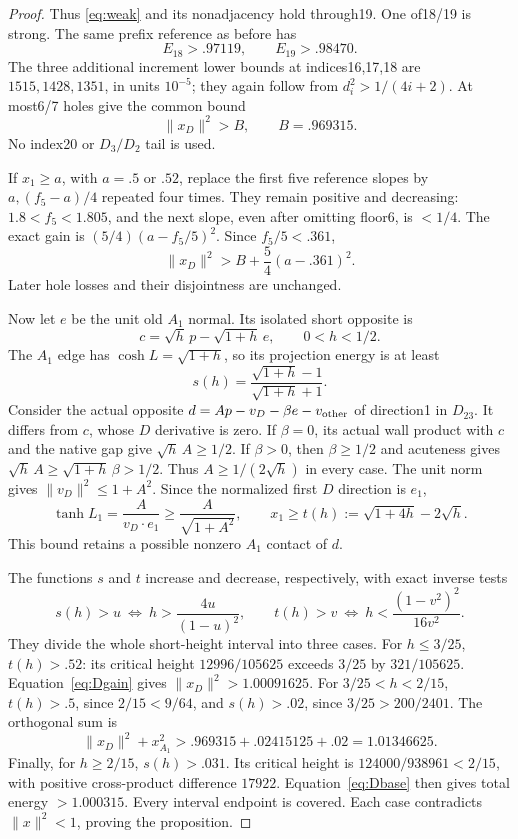 \documentclass[11pt]{article}
\theoremstyle{remark}
\begin{document}
\begin{proof}
Thus \eqref{eq:weak} and its nonadjacency hold through19.
One of18/19 is strong. The same prefix reference as before has
\[
 E_{18}>.97119,\qquad E_{19}>.98470.
\]
The three additional increment lower bounds at indices16,17,18
are \(1515,1428,1351\), in units \(10^{-5}\); they again follow
from \(d_i^2>1/(4i+2)\). At most6/7 holes give the common bound
\begin{equation}\label{eq:Dbase}
 \|x_D\|^2>B,\qquad B=.969315 .
\end{equation}
No index20 or \(D_3/D_2\) tail is used.

If \(x_1\ge a\), with \(a=.5\) or \(.52\), replace the first five
reference slopes by \(a,(f_5-a)/4\) repeated four times.
They remain positive and decreasing: \(1.8<f_5<1.805\), and the
next slope, even after omitting floor6, is \(<1/4\).
The exact gain is \((5/4)(a-f_5/5)^2\). Since \(f_5/5<.361\),
\begin{equation}\label{eq:Dgain}
 \|x_D\|^2>B+\frac54(a-.361)^2 .
\end{equation}
Later hole losses and their disjointness are unchanged.

Now let \(e\) be the unit old \(A_1\) normal. Its isolated
short opposite is
\[
 c=\sqrt h\,p-\sqrt{1+h}\,e,\qquad 0<h<1/2.
\]
The \(A_1\) edge has \(\cosh L=\sqrt{1+h}\), so its projection
energy is at least
\begin{equation}\label{eq:sheight}
 s(h)=\frac{\sqrt{1+h}-1}{\sqrt{1+h}+1}.
\end{equation}
Consider the actual opposite \(d=A p-v_D-\beta e-v_{\rm other}\)
of direction1 in \(D_{23}\). It differs from \(c\), whose \(D\)
derivative is zero. If \(\beta=0\), its actual wall product with
\(c\) and the native gap give \(\sqrt h\,A\ge1/2\).
If \(\beta>0\), then \(\beta\ge1/2\) and acuteness gives
\(\sqrt h\,A\ge\sqrt{1+h}\,\beta>1/2\).
Thus \(A\ge1/(2\sqrt h)\) in every case.
The unit norm gives \(\|v_D\|^2\le1+A^2\).
Since the normalized first \(D\) direction is \(e_1\),
\[
 \tanh L_1=\frac{A}{v_D\cdot e_1}
       \ge\frac A{\sqrt{1+A^2}},\qquad
 x_1\ge t(h):=\sqrt{1+4h}-2\sqrt h .
\]
This bound retains a possible nonzero \(A_1\) contact of \(d\).

The functions \(s\) and \(t\) increase and decrease, respectively,
with exact inverse tests
\[
 s(h)>u\ \Longleftrightarrow\
 h>\frac{4u}{(1-u)^2},\qquad
 t(h)>v\ \Longleftrightarrow\
 h<\frac{(1-v^2)^2}{16v^2}.
\]
They divide the whole short-height interval into three cases.
For \(h\le3/25\), \(t(h)>.52\): its critical height
\(12996/105625\) exceeds \(3/25\) by \(321/105625\).
Equation~\eqref{eq:Dgain} gives
\(\|x_D\|^2>1.00091625\).
For \(3/25<h<2/15\), \(t(h)>.5\), since \(2/15<9/64\),
and \(s(h)>.02\), since \(3/25>200/2401\). The orthogonal sum is
\[
 \|x_D\|^2+x_{A_1}^2>
 .969315+.02415125+.02=1.01346625 .
\]
Finally, for \(h\ge2/15\), \(s(h)>.031\). Its critical height is
\(124000/938961<2/15\), with positive cross-product difference
\(17922\). Equation~\eqref{eq:Dbase} then gives total energy
\(>1.000315\). Every interval endpoint is covered. Each case
contradicts \(\|x\|^2<1\), proving the proposition.
\end{proof}
\end{document}
